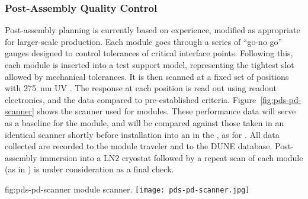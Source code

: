 \subsubsection{Post-Assembly Quality Control}

Post-assembly  planning is currently based on  experience, modified as appropriate for larger-scale production.  Each  module goes through a series of ``go-no go'' gauges 
designed to control tolerances of critical interface points.  Following this, each module is inserted into a test  support model, representing the tightest slot allowed by  mechanical tolerances. %
It is then scanned at a fixed set of positions 
with \SI{275}{nm} UV .  The   response at each position is read out using  readout electronics, and the data compared to pre-established criteria.  Figure~\ref{fig:pds-pd-scanner} shows %
the scanner used for  modules. These performance data will serve as a baseline for the  module, and will be compared against those taken in an identical scanner shortly before installation into an  in the , as for . %
All data collected are recorded to the module traveler and to the DUNE  database.
Post-assembly immersion into a LN2 cryostat followed by a repeat scan of each  module (as in ) is under consideration as a final  check.

\begin{dunefigure}{fig:pds-pd-scanner}
{ module scanner.}
  \texttt{[image: pds-pd-scanner.jpg]}
\end{dunefigure}


